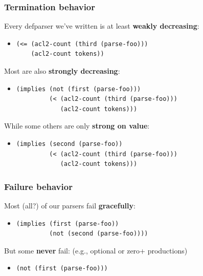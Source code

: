 \documentclass{beamer}
\newcommand{\SmallSkip}{\vspace{0.5cm}\noindent}
\begin{document}
\begin{frame}[fragile]
\frametitle{Termination behavior}

Every defparser we've written is at least {\bf weakly decreasing}:
\begin{itemize}
\item {\small\begin{verbatim}
(<= (acl2-count (third (parse-foo)))
    (acl2-count tokens))
\end{verbatim}}
\end{itemize}

\SmallSkip
Most are also {\bf strongly decreasing}:
\begin{itemize}
\item {\small\begin{verbatim}
(implies (not (first (parse-foo)))
         (< (acl2-count (third (parse-foo)))
            (acl2-count tokens)))
\end{verbatim}}
\end{itemize}

\SmallSkip
While some others are only {\bf strong on value}:
\begin{itemize}
\item {\small\begin{verbatim}
(implies (second (parse-foo))
         (< (acl2-count (third (parse-foo)))
            (acl2-count tokens)))
\end{verbatim}}
\end{itemize}

\end{frame}


\begin{frame}[fragile]
\frametitle{Failure behavior}

Most (all?) of our parsers fail {\bf gracefully}:
\begin{itemize}
\item {\small\begin{verbatim}
(implies (first (parse-foo))
         (not (second (parse-foo))))
\end{verbatim}}
\end{itemize}

\SmallSkip
But some {\bf never} fail: (e.g., optional or zero+ productions)
\begin{itemize}
\item {\small\begin{verbatim}
(not (first (parse-foo)))
\end{verbatim}}
\end{itemize}

\end{frame}
\end{document}
